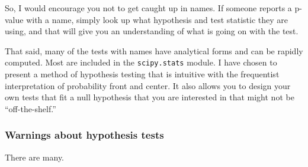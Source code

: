 So, I would encourage you not to get caught up in names.  If someone reports a p-value with a name, simply look up what hypothesis and test statistic they are using, and that will give you an understanding of what is going on with the test.

That said, many of the tests with names have analytical forms and can be rapidly computed.  Most are included in the \texttt{scipy.stats} module.  I have chosen to present a method of hypothesis testing that is intuitive with the frequentist interpretation of probability front and center.  It also allows you to design your own tests that fit a null hypothesis that you are interested in that might not be ``off-the-shelf.''

\subsubsection{Warnings about hypothesis tests}
There are many.
